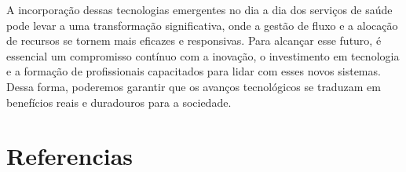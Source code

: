 \documentclass[conference, a4paper, 12pt]{IEEEtran}
\begin{document}
  A incorporação dessas tecnologias emergentes no dia a dia dos serviços de saúde pode levar a uma transformação significativa, onde a gestão de fluxo e a alocação de recursos se tornem mais eficazes e responsivas. Para alcançar esse futuro, é essencial um compromisso contínuo com a inovação, o investimento em tecnologia e a formação de profissionais capacitados para lidar com esses novos sistemas. Dessa forma, poderemos garantir que os avanços tecnológicos se traduzam em benefícios reais e duradouros para a sociedade.






\section{Referencias}
\label{sec:references}


\end{document}
